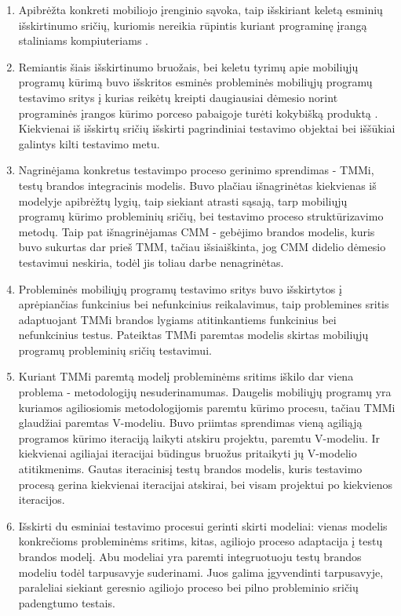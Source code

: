 \documentclass{VUMIFPSkursinis}
\begin{document}
\begin{enumerate}
\item  Apibrėžta konkreti mobiliojo įrenginio sąvoka, taip išskiriant keletą esminių išskirtinumo sričių, kuriomis nereikia rūpintis kuriant programinę įrangą staliniams kompiuteriams \cite{Satyanarayanan:1996:FCM:248052.248053}.

\item Remiantis šiais išskirtinumo bruožais, bei keletu tyrimų apie mobiliųjų programų kūrimą buvo išskritos esminės probleminės mobiliųjų programų testavimo sritys į kurias reikėtų kreipti daugiausiai dėmesio norint programinės įrangos kūrimo porceso pabaigoje turėti kokybišką produktą  \cite{Muccini:2012:STM:2663608.2663615, 6496451}. Kiekvienai iš išskirtų sričių išskirti pagrindiniai testavimo objektai bei iššūkiai galintys kilti testavimo metu.

\item Nagrinėjama konkretus testavimpo proceso gerinimo sprendimas - TMMi, testų brandos integracinis modelis. Buvo plačiau išnagrinėtas kiekvienas iš modelyje apibrėžtų lygių, taip siekiant atrasti sąsają, tarp mobiliųjų programų kūrimo probleminių sričių, bei testavimo proceso struktūrizavimo metodų. Taip pat išnagrinėjamas CMM - gebėjimo brandos modelis, kuris buvo sukurtas dar prieš TMM, tačiau išsiaiškinta, jog CMM didelio dėmesio testavimui neskiria, todėl jis toliau darbe nenagrinėtas.

\item Probleminės mobiliųjų programų testavimo sritys buvo išskirtytos į aprėpiančias funkcinius bei nefunkcinius reikalavimus, taip problemines sritis adaptuojant TMMi brandos lygiams atitinkantiems funkcinius bei nefunkcinius testus. Pateiktas TMMi paremtas modelis skirtas mobiliųjų programų probleminių sričių testavimui.

\item Kuriant TMMi paremtą modelį probleminėms sritims iškilo dar viena problema - metodologijų nesuderinamumas. Daugelis mobiliųjų programų yra kuriamos agiliosiomis metodologijomis paremtu kūrimo procesu, tačiau TMMi glaudžiai paremtas V-modeliu. Buvo priimtas sprendimas vieną agiliąją programos kūrimo iteraciją laikyti atskiru projektu, paremtu V-modeliu. Ir kiekvienai agiliajai iteracijai būdingus bruožus pritaikyti jų V-modelio atitikmenims. Gautas iteracinisį testų brandos modelis, kuris testavimo procesą gerina kiekvienai iteracijai atskirai, bei visam projektui po kiekvienos iteracijos.

\item Išskirti du esminiai testavimo procesui gerinti skirti modeliai: vienas modelis konkrečioms probleminėms sritims, kitas, agiliojo proceso adaptacija į testų brandos modelį. Abu modeliai yra paremti integruotuoju testų brandos modeliu todėl tarpusavyje suderinami. Juos galima įgyvendinti tarpusavyje, paraleliai siekiant geresnio agiliojo proceso bei pilno probleminio sričių padengtumo testais.
\end{enumerate}
\end{document}
